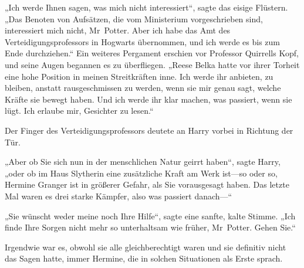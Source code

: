 „Ich werde Ihnen sagen, was mich nicht interessiert“, sagte das eisige Flüstern. „Das Benoten von Aufsätzen, die vom Ministerium vorgeschrieben sind, interessiert mich nicht, Mr~Potter. Aber ich habe das Amt des Verteidigungsprofessors in Hogwarts übernommen, und ich werde es bis zum Ende durchziehen.“ Ein weiteres Pergament erschien vor Professor Quirrells Kopf, und seine Augen begannen es zu überfliegen. „Reese Belka hatte vor ihrer Torheit eine hohe Position in meinen Streitkräften inne. Ich werde ihr anbieten, zu bleiben, anstatt rausgeschmissen zu werden, wenn sie mir genau sagt, welche Kräfte sie bewegt haben. Und ich werde ihr klar machen, was passiert, wenn sie lügt. Ich erlaube mir, Gesichter zu lesen.“

Der Finger des Verteidigungsprofessors deutete an Harry vorbei in Richtung der Tür.

„Aber ob Sie sich nun in der menschlichen Natur geirrt haben“, sagte Harry, „oder ob im Haus Slytherin eine zusätzliche Kraft am Werk ist—so oder so, Hermine Granger ist in größerer Gefahr, als Sie vorausgesagt haben. Das letzte Mal waren es drei starke Kämpfer, also was passiert danach—“

„Sie wünscht weder meine noch Ihre Hilfe“, sagte eine sanfte, kalte Stimme. „Ich finde Ihre Sorgen nicht mehr so unterhaltsam wie früher, Mr~Potter. Gehen Sie.“

\later

Irgendwie war es, obwohl sie alle gleichberechtigt waren und sie definitiv nicht das Sagen hatte, immer Hermine, die in solchen Situationen als Erste sprach.

